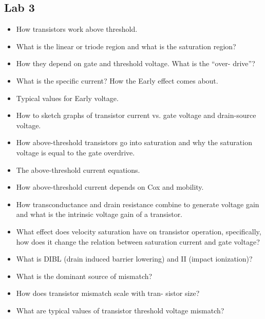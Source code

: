 \subsection{Lab 3}
\begin{itemize}
\item How transistors work above threshold. \item What is the linear or triode region and what is the
saturation region? \item How they depend on gate and threshold voltage. What is the “over-
drive”? \item What is the specific current? How the Early effect comes about. \item Typical values for
Early voltage. \item How to sketch graphs of transistor current vs. gate voltage and drain-source
voltage. \item How above-threshold transistors go into saturation and why the saturation voltage
is equal to the gate overdrive. \item The above-threshold current equations. \item How above-threshold
current depends on Cox and mobility.
\item How transconductance and drain resistance combine to generate voltage gain and what is
the intrinsic voltage gain of a transistor.
\item What effect does velocity saturation have on transistor operation, specifically, how does
it change the relation between saturation current and gate voltage? \item What is DIBL (drain
induced barrier lowering) and II (impact ionization)?
\item What is the dominant source of mismatch? \item How does transistor mismatch scale with tran-
sistor size? \item What are typical values of transistor threshold voltage mismatch?
\end{itemize}



